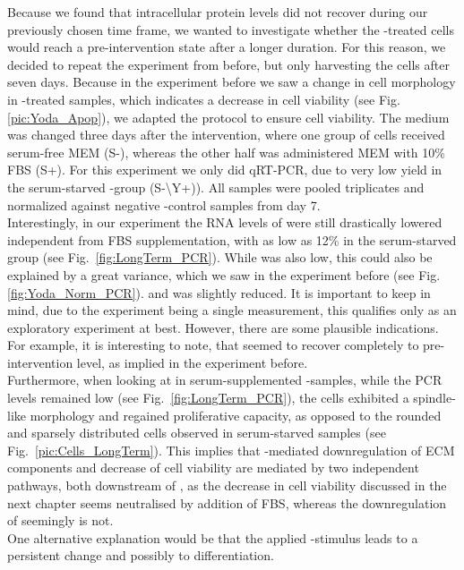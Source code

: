 Because we found that intracellular \colone{} protein levels did not recover during our previously chosen time frame, we wanted to investigate whether the \Yoda{}-treated cells would reach a pre-intervention state after a longer duration. For this reason, we decided to repeat the experiment from before, but only harvesting the cells after seven days. Because in the experiment before we saw a change in cell morphology in \Yoda{}-treated samples, which indicates a decrease in cell viability (see Fig. \ref{pic:Yoda_Apop}), we adapted the protocol to ensure cell viability. The medium was changed three days after the intervention, where one group of cells received serum-free MEM\textalpha{} (S-), whereas the other half was administered MEM\textalpha{} with 10\% FBS (S+). For this experiment we only did qRT-PCR, due to very low yield in the serum-starved \Yoda{}-group (S-\textbackslash{}Y+)). All samples were pooled triplicates and normalized against negative \Yoda{}-control samples from day 7.\\
Interestingly, in our experiment the RNA levels of \colone{} were still drastically lowered independent from FBS supplementation, with as low as 12\% in the serum-starved group (see Fig.~\ref{fig:LongTerm_PCR}). While \colthreeGene{} was also low, this could also be explained by a great variance, which we saw in the experiment before (see Fig. \ref{fig:Yoda_Norm_PCR}). \ILGene{} and \FnGene{} was slightly reduced. It is important to keep in mind, due to the experiment being a single measurement, this qualifies only as an exploratory experiment at best. However, there are some plausible indications. For example, it is interesting to note, that \ILGene{} seemed to recover completely to pre-intervention level, as implied in the experiment before. \\
Furthermore, when looking at \coloneGene{} in serum-supplemented \Yoda{}-samples, while the PCR levels remained low (see Fig.~\vref{fig:LongTerm_PCR}), the cells exhibited a spindle-like morphology and regained proliferative capacity, as opposed to the rounded and sparsely distributed cells observed in serum-starved samples (see Fig.~\ref{pic:Cells_LongTerm}). This implies that \Piezo{}-mediated downregulation of ECM components and decrease of cell viability are mediated by two independent pathways, both downstream of \Piezo{}, as the decrease in cell viability discussed in the next chapter seems neutralised by addition of FBS, whereas the downregulation of \coloneGene{} seemingly is not.\\
One alternative explanation would be that the applied \Yoda{}-stimulus leads to a persistent change and possibly to differentiation.\par

